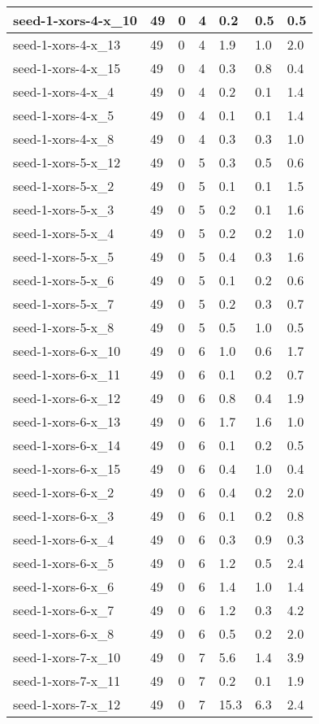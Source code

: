 \begin{scriptsize}
\begin{longtable}{|p{5cm}|l|l|l|l|l|l|}
seed-1-xors-4-x\_10&49&0&4&0.2&0.5&0.5 \\ \hline 
seed-1-xors-4-x\_13&49&0&4&1.9&1.0&2.0 \\ \hline 
seed-1-xors-4-x\_15&49&0&4&0.3&0.8&0.4 \\ \hline 
seed-1-xors-4-x\_4&49&0&4&0.2&0.1&1.4 \\ \hline 
seed-1-xors-4-x\_5&49&0&4&0.1&0.1&1.4 \\ \hline 
seed-1-xors-4-x\_8&49&0&4&0.3&0.3&1.0 \\ \hline 
seed-1-xors-5-x\_12&49&0&5&0.3&0.5&0.6 \\ \hline 
seed-1-xors-5-x\_2&49&0&5&0.1&0.1&1.5 \\ \hline 
seed-1-xors-5-x\_3&49&0&5&0.2&0.1&1.6 \\ \hline 
seed-1-xors-5-x\_4&49&0&5&0.2&0.2&1.0 \\ \hline 
seed-1-xors-5-x\_5&49&0&5&0.4&0.3&1.6 \\ \hline 
seed-1-xors-5-x\_6&49&0&5&0.1&0.2&0.6 \\ \hline 
seed-1-xors-5-x\_7&49&0&5&0.2&0.3&0.7 \\ \hline 
seed-1-xors-5-x\_8&49&0&5&0.5&1.0&0.5 \\ \hline 
seed-1-xors-6-x\_10&49&0&6&1.0&0.6&1.7 \\ \hline 
seed-1-xors-6-x\_11&49&0&6&0.1&0.2&0.7 \\ \hline 
seed-1-xors-6-x\_12&49&0&6&0.8&0.4&1.9 \\ \hline 
seed-1-xors-6-x\_13&49&0&6&1.7&1.6&1.0 \\ \hline 
seed-1-xors-6-x\_14&49&0&6&0.1&0.2&0.5 \\ \hline 
seed-1-xors-6-x\_15&49&0&6&0.4&1.0&0.4 \\ \hline 
seed-1-xors-6-x\_2&49&0&6&0.4&0.2&2.0 \\ \hline 
seed-1-xors-6-x\_3&49&0&6&0.1&0.2&0.8 \\ \hline 
seed-1-xors-6-x\_4&49&0&6&0.3&0.9&0.3 \\ \hline 
seed-1-xors-6-x\_5&49&0&6&1.2&0.5&2.4 \\ \hline 
seed-1-xors-6-x\_6&49&0&6&1.4&1.0&1.4 \\ \hline 
seed-1-xors-6-x\_7&49&0&6&1.2&0.3&4.2 \\ \hline 
seed-1-xors-6-x\_8&49&0&6&0.5&0.2&2.0 \\ \hline 
seed-1-xors-7-x\_10&49&0&7&5.6&1.4&3.9 \\ \hline 
seed-1-xors-7-x\_11&49&0&7&0.2&0.1&1.9 \\ \hline 
seed-1-xors-7-x\_12&49&0&7&15.3&6.3&2.4 \\ \hline 

\end{longtable}
\end{scriptsize}
